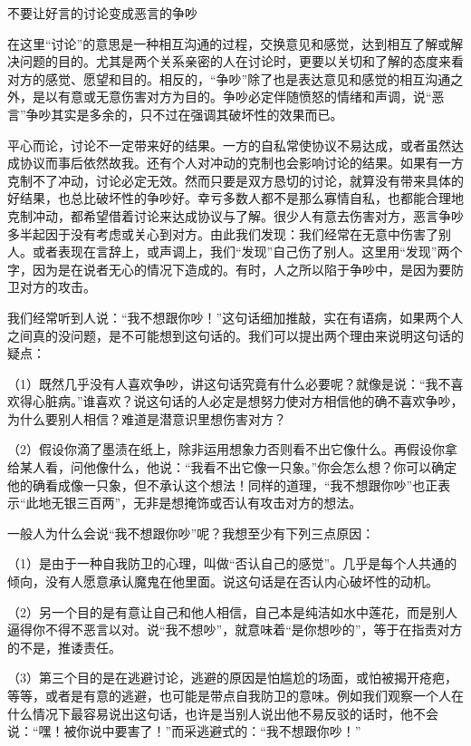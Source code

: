 \documentclass[12pt,UTF8,openany]{ctexbook}
\begin{document}
不要让好言的讨论变成恶言的争吵


在这里“讨论”的意思是一种相互沟通的过程，交换意见和感觉，达到相互了解或解决问题的目的。尤其是两个关系亲密的人在讨论时，更要以关切和了解的态度来看对方的感觉、愿望和目的。相反的，“争吵”除了也是表达意见和感觉的相互沟通之外，是以有意或无意伤害对方为目的。争吵必定伴随愤怒的情绪和声调，说“恶言”争吵其实是多余的，只不过在强调其破坏性的效果而已。

平心而论，讨论不一定带来好的结果。一方的自私常使协议不易达成，或者虽然达成协议而事后依然故我。还有个人对冲动的克制也会影响讨论的结果。如果有一方克制不了冲动，讨论必定无效。然而只要是双方恳切的讨论，就算没有带来具体的好结果，也总比破坏性的争吵好。幸亏多数人都不是那么寡情自私，也都能合理地克制冲动，都希望借着讨论来达成协议与了解。很少人有意去伤害对方，恶言争吵多半起因于没有考虑或关心到对方。由此我们发现：我们经常在无意中伤害了别人。或者表现在言辞上，或声调上，我们“发现”自己伤了别人。这里用“发现”两个字，因为是在说者无心的情况下造成的。有时，人之所以陷于争吵中，是因为要防卫对方的攻击。

我们经常听到人说：“我不想跟你吵！”这句话细加推敲，实在有语病，如果两个人之间真的没问题，是不可能想到这句话的。我们可以提出两个理由来说明这句话的疑点：

（1）既然几乎没有人喜欢争吵，讲这句话究竟有什么必要呢？就像是说：“我不喜欢得心脏病。”谁喜欢？说这句话的人必定是想努力使对方相信他的确不喜欢争吵，为什么要别人相信？难道是潜意识里想伤害对方？

（2）假设你滴了墨渍在纸上，除非运用想象力否则看不出它像什么。再假设你拿给某人看，问他像什么，他说：“我看不出它像一只象。”你会怎么想？你可以确定他的确看成像一只象，但不承认这个想法！同样的道理，“我不想跟你吵”也正表示“此地无银三百两”，无非是想掩饰或否认有攻击对方的想法。

一般人为什么会说“我不想跟你吵”呢？我想至少有下列三点原因：

（1）是由于一种自我防卫的心理，叫做“否认自己的感觉”。几乎是每个人共通的倾向，没有人愿意承认魔鬼在他里面。说这句话是在否认内心破坏性的动机。

（2）另一个目的是有意让自己和他人相信，自己本是纯洁如水中莲花，而是别人逼得你不得不恶言以对。说“我不想吵”，就意味着“是你想吵的”，等于在指责对方的不是，推诿责任。

（3）第三个目的是在逃避讨论，逃避的原因是怕尴尬的场面，或怕被揭开疮疤，等等，或者是有意的逃避，也可能是带点自我防卫的意味。例如我们观察一个人在什么情况下最容易说出这句话，也许是当别人说出他不易反驳的话时，他不会说：“嘿！被你说中要害了！”而采逃避式的：“我不想跟你吵！”
\end{document}
